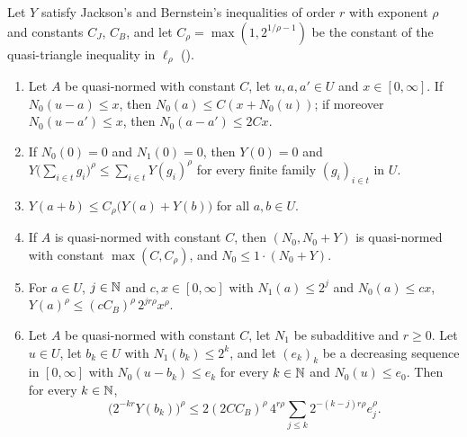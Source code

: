 \begin{lemma}
\label{lem:jackson-bernstein-couple}
\leanok
{}
Let $Y$ satisfy Jackson's and Bernstein's inequalities of order $r$ with exponent $\rho$ and
constants $C_J$, $C_B$, and let $C_\rho = \max(1, 2^{1/\rho - 1})$ be the constant of the
quasi-triangle inequality in $\ell_\rho$ ().
\begin{enumerate}
  \item Let $A$ be quasi-normed with constant $C$, let $u, a, a' \in U$ and
    $x \in [0, \infty]$. If $N_0(u - a) \leq x$, then $N_0(a) \leq C (x + N_0(u))$; if
    moreover $N_0(u - a') \leq x$, then $N_0(a - a') \leq 2 C x$.
  \item If $N_0(0) = 0$ and $N_1(0) = 0$, then $Y(0) = 0$ and
    $Y\bigl(\sum_{i \in t} g_i\bigr)^\rho \leq \sum_{i \in t} Y(g_i)^\rho$ for every finite
    family $(g_i)_{i \in t}$ in $U$.
  \item $Y(a + b) \leq C_\rho \bigl(Y(a) + Y(b)\bigr)$ for all $a, b \in U$.
  \item If $A$ is quasi-normed with constant $C$, then $(N_0, N_0 + Y)$ is quasi-normed with
    constant $\max(C, C_\rho)$, and $N_0 \leq 1 \cdot (N_0 + Y)$.
  \item For $a \in U$, $j \in \mathbb{N}$ and $c, x \in [0, \infty]$ with $N_1(a) \leq 2^j$ and
    $N_0(a) \leq c x$, $Y(a)^\rho \leq (c C_B)^\rho \, 2^{jr\rho} x^\rho$.
  \item Let $A$ be quasi-normed with constant $C$, let $N_1$ be subadditive and $r \geq 0$. Let
    $u \in U$, let $b_k \in U$ with $N_1(b_k) \leq 2^k$, and let $(e_k)_k$ be a decreasing
    sequence in $[0, \infty]$ with $N_0(u - b_k) \leq e_k$ for every $k \in \mathbb{N}$ and
    $N_0(u) \leq e_0$. Then for every $k \in \mathbb{N}$,
    \[
      \bigl(2^{-kr} Y(b_k)\bigr)^\rho
      \leq 2 (2 C C_B)^\rho \, 4^{r\rho} \sum_{j \leq k} 2^{-(k-j) r \rho} e_j^\rho .
    \]
\end{enumerate}
\end{lemma}

